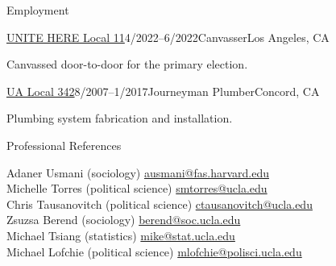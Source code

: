 \documentclass[
	11pt, %
]{resume} %
\begin{document}
\begin{samepage}
\begin{rSection}{Employment}
	
		\begin{rSubsection}{\href{https://www.unitehere11.org/}{UNITE HERE Local 11}}{4/2022--6/2022}{Canvasser}{Los Angeles, CA}
	\item Canvassed door-to-door for the primary election.
\end{rSubsection}

	\begin{rSubsection}{\href{https://ua342.org/}{UA Local 342}}{8/2007--1/2017}{Journeyman Plumber}{Concord, CA}
	\item Plumbing system fabrication and installation.
	\end{rSubsection}

\end{rSection}
\end{samepage}


\begin{rSection}{Professional References}

Adaner Usmani (sociology) \hfill \href{mailto:ausmani@fas.harvard.edu}{ausmani@fas.harvard.edu}\\
Michelle Torres (political science) \hfill \href{mailto:smtorres@ucla.edu}{smtorres@ucla.edu}\\
Chris Tausanovitch (political science) \hfill \href{mailto:ctausanovitch@ucla.edu}{ctausanovitch@ucla.edu}\\
Zsuzsa Berend (sociology) \hfill \href{mailto:berend@soc.ucla.edu}{berend@soc.ucla.edu}\\
Michael Tsiang (statistics) \hfill \href{mailto:mike@stat.ucla.edu}{mike@stat.ucla.edu}\\
Michael Lofchie (political science) \hfill \href{mailto:mlofchie@polisci.ucla.edu}{mlofchie@polisci.ucla.edu}
\end{rSection}

\end{document}
